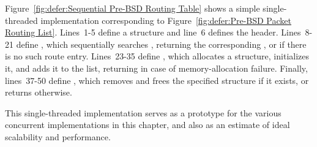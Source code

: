Figure~\ref{fig:defer:Sequential Pre-BSD Routing Table}
shows a simple single-threaded implementation corresponding to
Figure~\ref{fig:defer:Pre-BSD Packet Routing List}.
Lines~1-5 define a  structure and line~6 defines
the  header.
Lines~8-21 define , which sequentially searches
, returning the corresponding , or
 if there is no such route entry.
Lines~23-35 define , which allocates a
 structure, initializes it, and adds it to the
list, returning  in case of memory-allocation failure.
Finally, lines~37-50 define , which removes and
frees the specified  structure if it exists,
or returns  otherwise.

This single-threaded implementation serves as a prototype for the various
concurrent implementations in this chapter, and also as an estimate of
ideal scalability and performance.









